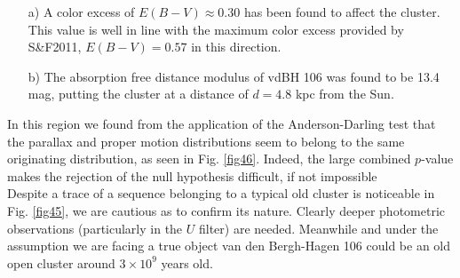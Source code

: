 \documentclass[draft]{aa}
\begin{document}
\begin{itemize}
\item [a)] A color excess of $E(B-V)\approx0.30$ has been found to affect the
cluster. This value is well in line with the maximum color excess provided
by S\&F2011, $E(B-V)=0.57$ in this direction.
\item [b)] The absorption free distance modulus of vdBH 106 was found to be
13.4 mag, putting the cluster at a distance of $d=4.8$ kpc from the Sun.
\end{itemize}

In this region we found from the application of the Anderson-Darling test that
the parallax and proper motion distributions seem to belong to the same
originating distribution, as seen in Fig. \ref{fig46}. Indeed, the
large combined $p$-value makes the rejection of the null hypothesis difficult,
if not impossible\\

Despite a trace of a sequence belonging to a typical old cluster is
noticeable in Fig. \ref{fig45}, we are cautious as to confirm its nature.
Clearly deeper photometric observations (particularly in the $U$ filter) are
needed. Meanwhile and under the assumption we are facing a true object van
den Bergh-Hagen 106 could be an old open cluster around $3\times10^9$ years
old.
\end{document}
